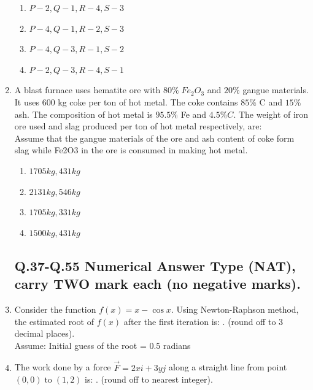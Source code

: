 \documentclass[journal]{IEEEtran}
\theoremstyle{remark}
\begin{document}
\begin{enumerate}[resume]
\begin{multicols}{2}
\begin{enumerate}
\item $P-2,Q-1,R-4,S-3$
\item $P-4,Q-1,R-2,S-3$
\item $P-4,Q-3,R-1,S-2$
\item $P-2,Q-3,R-4,S-1$
\end{enumerate}
\end{multicols}
\item A blast furnace uses hematite ore with $80\% \;Fe_2O_3$ and $20\%$ gangue
materials. It uses 600 kg coke per ton of hot metal. The coke contains $85\%$
C and $15\%$ ash. The composition of hot metal is $95.5\%$ Fe and $4.5\% C$.
The weight of iron ore used and slag produced per ton of hot metal
respectively, are:\\
Assume that the gangue materials of the ore and ash content of coke form
slag while Fe2O3 in the ore is consumed in making hot metal.
\hfill{}
\begin{multicols}{2}
\begin{enumerate}
\item $1705 kg, 431 kg$
\item $2131 kg, 546 kg$
\item $1705 kg, 331 kg$
\item $1500 kg, 431 kg$
\end{enumerate}
\end{multicols}
\subsection*{Q.37-Q.55 Numerical Answer Type (NAT), carry TWO mark each (no negative marks).}


\item Consider the function $f(x)=x-\cos{x}$. Using Newton-Raphson method,
the estimated root of $f(x)$ after the first iteration is:  \underline {\hspace{2cm}}. (round off to 3 decimal places).\\ 
Assume: Initial guess of the root = 0.5 radians
\hfill{}

\item The work done by a force $\vec{F}=2xi
+3yj$  along a straight line from point $(0, 0)\; \text{to}\; (1, 2)$ is: \underline {\hspace{2cm}}. (round off to nearest integer). \hfill{}


\end{enumerate}
\end{document}
